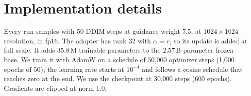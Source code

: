 \documentclass{article} %
\renewcommand{\topfraction}{0.92}
\renewcommand{\bottomfraction}{0.85}
\renewcommand{\textfraction}{0.20}
\renewcommand{\floatpagefraction}{0.70}
\newcommand{\adrank}{32}
\newcommand{\adparams}{35.8}
\newcommand{\adbase}{2.57}
\newcommand{\adepochs}{600}
\newcommand{\adsteps}{30{,}000}
\begin{document}





\appendix
\renewcommand{\topfraction}{0.95}\renewcommand{\bottomfraction}{0.9}\renewcommand{\textfraction}{0.05}\renewcommand{\floatpagefraction}{0.85}\setcounter{totalnumber}{4}\setcounter{topnumber}{3}
\setcounter{topnumber}{3}\setcounter{bottomnumber}{2}\setcounter{totalnumber}{4}\renewcommand{\textfraction}{0.07}




\section{Implementation details}
\label{app:implementation}

Every run samples with 50 DDIM steps at guidance weight 7.5, at $1024\times1024$ resolution, in fp16. The adapter has rank \adrank{} with $\alpha = r$, so its update is added at full scale. It adds \adparams{}\,M trainable parameters to the \adbase{}\,B-parameter frozen base. We train it with AdamW on a schedule of 50{,}000 optimizer steps (1{,}000 epochs of 50); the learning rate starts at $10^{-4}$ and follows a cosine schedule that reaches zero at the end. We use the checkpoint at \adsteps{} steps (\adepochs{} epochs). Gradients are clipped at norm 1.0. 
\end{document}
